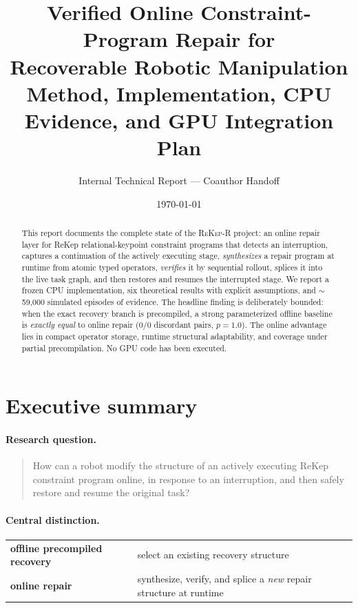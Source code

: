 \documentclass[11pt]{article}
\title{\textbf{Verified Online Constraint-Program Repair for\\
Recoverable Robotic Manipulation}\\[4pt]
\large Method, Implementation, CPU Evidence, and GPU Integration Plan}
\author{Internal Technical Report --- Coauthor Handoff}
\date{\today}
\newcommand{\method}{\textsc{ReKep-R}}
\begin{document}
\maketitle
\begin{abstract}
\noindent
This report documents the complete state of the \method{} project: an online
repair layer for ReKep relational-keypoint constraint programs that detects an
interruption, captures a continuation of the actively executing stage,
\emph{synthesizes} a repair program at runtime from atomic typed operators,
\emph{verifies} it by sequential rollout, splices it into the live task graph,
and then restores and resumes the interrupted stage. We report a frozen CPU
implementation, six theoretical results with explicit assumptions, and
$\sim$59{,}000 simulated episodes of evidence. The headline finding is
deliberately bounded: when the exact recovery branch is precompiled, a strong
parameterized offline baseline is \emph{exactly equal} to online repair
($0/0$ discordant pairs, $p=1.0$). The online advantage lies in compact
operator storage, runtime structural adaptability, and coverage under partial
precompilation. No GPU code has been executed.
\end{abstract}

\tableofcontents
\newpage

\section{Executive summary}

\paragraph{Research question.}
\begin{quote}
How can a robot modify the structure of an actively executing ReKep constraint
program online, in response to an interruption, and then safely restore and
resume the original task?
\end{quote}

\paragraph{Central distinction.}
\begin{center}
\begin{tabular}{ll}
\toprule
\textbf{offline precompiled recovery} & select an existing recovery structure \\
\textbf{online repair} & synthesize, verify, and splice a \emph{new} repair
structure at runtime \\
\bottomrule
\end{tabular}
\end{center}
\end{document}

